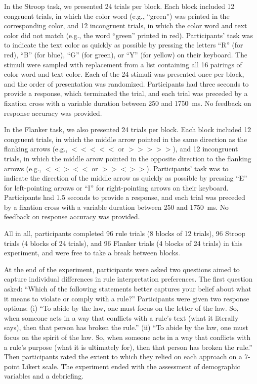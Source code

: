 \documentclass[pdflatex,sn-nature]{sn-jnl}
\begin{document}
In the Stroop task, we presented 24 trials per block. Each block included 12 congruent trials, in which the color word (e.g., ``green'') was printed in the corresponding color, and 12 incongruent trials, in which the color word and text color did not match (e.g., the word ``green'' printed in red). Participants' task was to indicate the text color as quickly as possible by pressing the letters ``R'' (for red), ``B'' (for blue), ``G'' (for green), or ``Y'' (for yellow) on their keyboard. The stimuli were sampled with replacement from a list containing all 16 pairings of color word and text color. Each of the 24 stimuli was presented once per block, and the order of presentation was randomized. Participants had three seconds to provide a response, which terminated the trial, and each trial was preceded by a fixation cross with a variable duration between 250 and 1750~ms. No feedback on response accuracy was provided.

In the Flanker task, we also presented 24 trials per block. Each block included 12 congruent trials, in which the middle arrow pointed in the same direction as the flanking arrows (e.g., $<\!<\!<\!<\!<$ or $>\!>\!>\!>\!>$), and 12 incongruent trials, in which the middle arrow pointed in the opposite direction to the flanking arrows (e.g., $<\!<\!>\!<\!<$ or $>\!>\!<\!>\!>$). Participants' task was to indicate the direction of the middle arrow as quickly as possible by pressing ``E'' for left-pointing arrows or ``I'' for right-pointing arrows on their keyboard. Participants had 1.5 seconds to provide a response, and each trial was preceded by a fixation cross with a variable duration between 250 and 1750~ms. No feedback on response accuracy was provided.

All in all, participants completed 96 rule trials (8 blocks of 12 trials), 96 Stroop trials (4 blocks of 24 trials), and 96 Flanker trials (4 blocks of 24 trials) in this experiment, and were free to take a break between blocks.

At the end of the experiment, participants were asked two questions aimed to capture individual differences in rule interpretation preferences. The first question asked: ``Which of the following statements better captures your belief about what it means to violate or comply with a rule?'' Participants were given two response options: (i) ``To abide by the law, one must focus on the letter of the law. So, when someone acts in a way that conflicts with a rule's text (what it literally says), then that person has broken the rule.'' (ii) ``To abide by the law, one must focus on the spirit of the law. So, when someone acts in a way that conflicts with a rule's purpose (what it is ultimately for), then that person has broken the rule.'' Then participants rated the extent to which they relied on each approach on a 7-point Likert scale. The experiment ended with the assessment of demographic variables and a debriefing.
\end{document}
